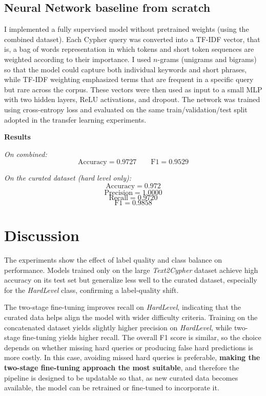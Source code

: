 \documentclass{article}
\begin{document}
\subsection{ Neural Network baseline from scratch}

I implemented a fully supervised model without pretrained weights (using the combined dataset). Each Cypher query was converted into a TF-IDF vector, that is, a bag of words representation in which tokens and short token sequences are weighted according to their importance. I used \(n\)-grams (unigrams and bigrams) so that the model could capture both individual keywords and short phrases, while TF-IDF weighting emphasized terms that are frequent in a specific query but rare across the corpus. These vectors were then used as input to a small MLP with two hidden layers, ReLU activations, and dropout. The network was trained using cross-entropy loss and evaluated on the same train/validation/test split adopted in the transfer learning experiments.

\textbf{Results}

\textit{On combined:}
\[
\text{Accuracy} = 0.9727 \qquad \text{F1} = 0.9529
\]

\textit{On the curated dataset (hard level only):}
\[
\text{Accuracy} = 0.972
\]
\[
\text{Precision} = 1.0000
\]
\[
\text{Recall} = 0.9720
\]
\[
\text{F1} = 0.9858
\]


\section{Discussion}


The experiments show the effect of label quality and class balance on performance. Models trained only on the large \textit{Text2Cypher} dataset achieve high accuracy on its test set but generalize less well to the curated dataset, especially for the \textit{HardLevel} class, confirming a label-quality shift.

The two-stage fine-tuning improves recall on \textit{HardLevel}, indicating that the curated data helps align the model with wider difficulty criteria. Training on the concatenated dataset yields slightly higher precision on \textit{HardLevel}, while two-stage fine-tuning yields higher recall. The overall F1 score is similar, so the choice depends on whether missing hard queries or producing false hard predictions is more costly. In this case, avoiding missed hard queries is preferable, \textbf{making the two-stage fine-tuning approach the most suitable}, and therefore the pipeline is designed to be updatable so that, as new curated data becomes available, the model can be retrained or fine‑tuned to incorporate it.
\end{document}
